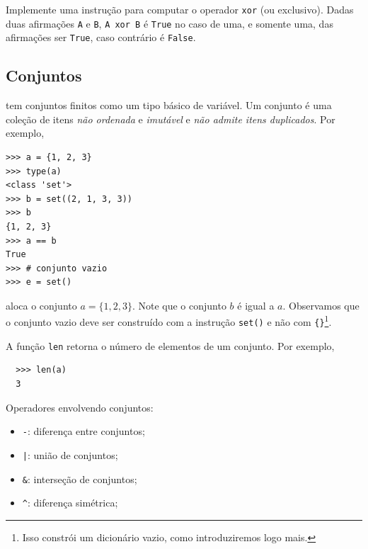 \documentclass[12pt]{article}
\begin{document}
\begin{exr}
  Implemente uma instrução para computar o operador \lstinline+xor+ (ou exclusivo). Dadas duas afirmações \lstinline+A+ e \lstinline+B+, \lstinline+A xor B+ é \lstinline+True+ no caso de uma, e somente uma, das afirmações ser \lstinline+True+, caso contrário é \lstinline+False+.
\end{exr}

\subsection{Conjuntos}

{\python} tem conjuntos finitos como um tipo básico de variável. Um conjunto é uma coleção de itens \emph{não ordenada} e \emph{imutável} e \emph{não admite itens duplicados}. Por exemplo,
\begin{lstlisting}
>>> a = {1, 2, 3}
>>> type(a)
<class 'set'>
>>> b = set((2, 1, 3, 3))
>>> b
{1, 2, 3}
>>> a == b
True
>>> # conjunto vazio
>>> e = set()
\end{lstlisting}
aloca o conjunto $a = \{1,2, 3\}$. Note que o conjunto $b$ é igual a $a$. Observamos que o conjunto vazio deve ser construído com a instrução \lstinline+set()+ e não com \lstinline+{}+\footnote{Isso constrói um dicionário vazio, como introduziremos logo mais.}.

\begin{obs}
  A função {\python} \lstinline+len+ retorna o número de elementos de um conjunto. Por exemplo,
  \begin{lstlisting}
  >>> len(a)
  3
  \end{lstlisting}
\end{obs}

Operadores envolvendo conjuntos:
\begin{itemize}
\item[] \lstinline+-+: diferença entre conjuntos;
\item[] \lstinline+|+: união de conjuntos;
\item[] \lstinline+&+: interseção de conjuntos;
\item[] \lstinline+^+: diferença simétrica;
\end{itemize}
\end{document}
